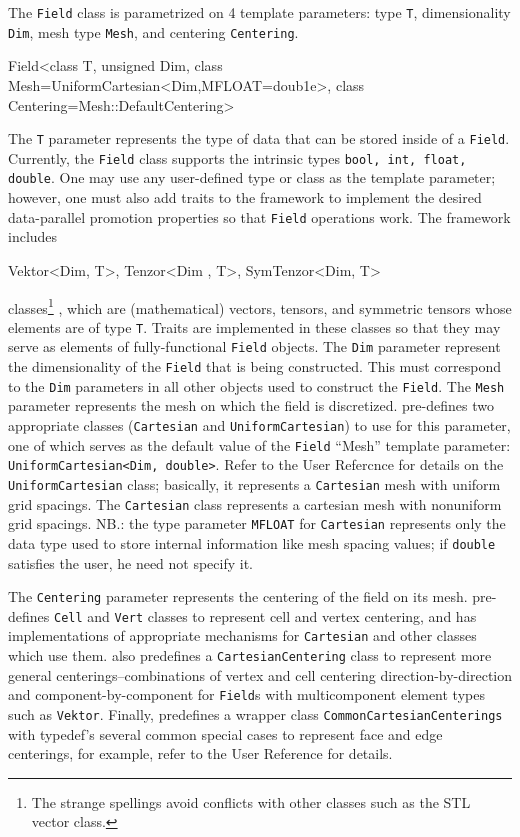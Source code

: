 The \texttt{Field} class is parametrized on 4 template parameters: type \texttt{T}, dimensionality \texttt{Dim},
mesh type \texttt{Mesh}, and centering \texttt{Centering}.
\begin{smallcode}
Field<class T, unsigned Dim, class Mesh=UniformCartesian<Dim,MFLOAT=doub1e>,
      class Centering=Mesh::DefaultCentering>
\end{smallcode}
The \texttt{T} parameter represents the type of data that can be stored inside of a \texttt{Field}. Currently,
the \texttt{Field} class supports the intrinsic types \texttt{bool, int, float, double}. One may use any
user-defined type or class as the template parameter; however, one must also add traits to the
framework to implement the desired data-parallel promotion properties so that \texttt{Field} operations
work. The framework includes 
\begin{smallcode}
Vektor<Dim, T>, Tenzor<Dim , T>, SymTenzor<Dim, T> 
\end{smallcode}
classes\footnote{The strange spellings avoid conflicts with other classes such as the STL vector class.}
, which are (mathematical) vectors, tensors, and symmetric tensors whose
elements are of type \texttt{T}. Traits are implemented in these classes so that they may serve as elements
of fully-functional \texttt{Field} objects.
The \texttt{Dim} parameter represent the dimensionality of the \texttt{Field} that is being constructed. This
must correspond to the \texttt{Dim} parameters in all other objects used to construct the \texttt{Field}.
The \texttt{Mesh} parameter represents the mesh on which the field is discretized. \ippl
pre-defines two appropriate classes (\texttt{Cartesian} and \texttt{UniformCartesian}) to use for this
parameter, one of which serves as the default value of the \texttt{Field} ``Mesh'' template parameter:
\texttt{UniformCartesian<Dim, double>}. Refer to the \ippl User Refercnce for details on the
\texttt{UniformCartesian} class; basically, it represents a \texttt{Cartesian} mesh with uniform grid spacings. 
The \texttt{Cartesian} class represents a cartesian mesh with nonuniform grid spacings. NB.:
the type parameter \texttt{MFLOAT} for \texttt{Cartesian} represents only the data type used to store internal
information like mesh spacing values; if \texttt{double} satisfies the user, he need not specify it.

The \texttt{Centering} parameter represents the centering of the field on its mesh. \ippl
pre-defines \texttt{Cell} and \texttt{Vert} classes to represent cell and vertex centering, and has implementations 
of appropriate mechanisms for \texttt{Cartesian} and other classes which use them. \ippl
also predefines a \texttt{CartesianCentering} class to represent more general centerings--combinations 
of vertex and cell centering direction-by-direction and component-by-component for
\texttt{Field}s with multicomponent element types such as \texttt{Vektor}. Finally, \ippl predefines a
wrapper class \texttt{CommonCartesianCenterings} with typedef’s several common special
cases to represent face and edge centerings, for example, refer to the \ippl User Reference
for details.

